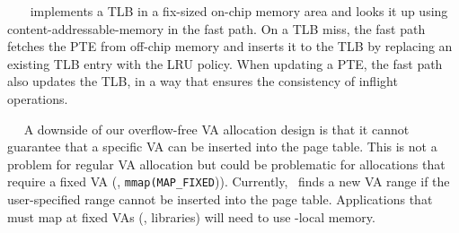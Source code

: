 ~~
\sys\ implements a TLB in a fix-sized on-chip memory area and looks it up using content-addressable-memory in the fast path.
On a TLB miss, the fast path fetches the PTE from off-chip memory and inserts it to the TLB by replacing an existing TLB entry with the LRU policy.
When updating a PTE, the fast path also updates the TLB, in a way that ensures the consistency of inflight operations.
%

~~
A downside of our overflow-free VA allocation design is that it cannot guarantee that a specific VA can be inserted into the page table. This is not a problem for regular VA allocation but could be problematic for allocations that require a fixed VA (\eg, \texttt{mmap(MAP\_FIXED})). 
Currently, \sys\ finds a new VA range if the user-specified range cannot be inserted into the page table. Applications that must map at fixed VAs (\eg, libraries) will need to use \CN-local memory.


